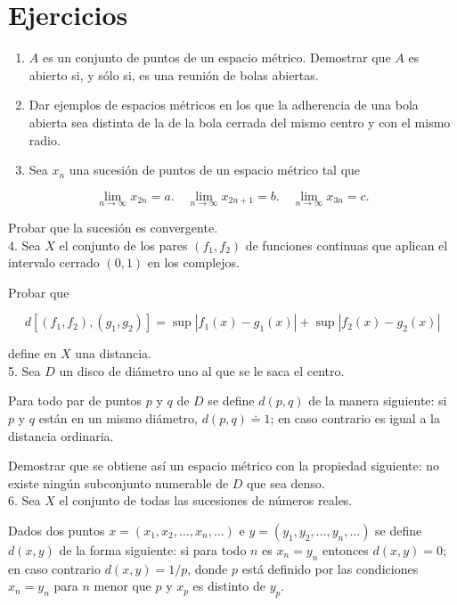 \documentclass[10pt]{article}
\theoremstyle{plain}
\theoremstyle{definition}
\theoremstyle{remark}
\begin{document}
\section*{Ejercicios}
\begin{enumerate}
  \item $A$ es un conjunto de puntos de un espacio métrico. Demostrar que $A$ es abierto si, y sólo si, es una reunión de bolas abiertas.
  \item Dar ejemplos de espacios métricos en los que la adherencia de una bola abierta sea distinta de la de la bola cerrada del mismo centro y con el mismo radio.
  \item Sea $x_{n}$ una sucesión de puntos de un espacio métrico tal que
\end{enumerate}

$$
\lim _{n \rightarrow \infty} x_{2 n}=a . \quad \lim _{n \rightarrow \infty} x_{2 n+1}=b . \quad \lim _{n \rightarrow \infty} x_{3 n}=c .
$$

Probar que la sucesión es convergente.\\
4. Sea $X$ el conjunto de los pares $\left(f_{1}, f_{2}\right)$ de funciones continuas que aplican el intervalo cerrado $(0,1)$ en los complejos.

Probar que

$$
d\left[\left(f_{1}, f_{2}\right),\left(g_{1}, g_{2}\right)\right]=\sup \left|f_{1}(x)-g_{1}(x)\right|+\sup \left|f_{2}(x)-g_{2}(x)\right|
$$

define en $X$ una distancia.\\
5. Sea $D$ un disco de diámetro uno al que se le saca el centro.

Para todo par de puntos $p$ y $q$ de $D$ se define $d(p, q)$ de la manera siguiente: si $p$ y $q$ están en un mismo diámetro, $d(p, q) \doteq 1$; en caso contrario es igual a la distancia ordinaria.

Demostrar que se obtiene así un espacio métrico con la propiedad siguiente: no existe ningún subconjunto numerable de $D$ que sea denso.\\
6. Sea $X$ el conjunto de todas las sucesiones de números reales.

Dados dos puntos $x=\left(x_{1}, x_{2}, \ldots, x_{n}, \ldots\right)$ e $y=\left(y_{1}, y_{2}, \ldots, y_{n}, \ldots\right)$ se define $d(x, y)$ de la forma siguiente: si para todo $n$ es $x_{n}=y_{n}$ entonces $d(x, y)=0$; en caso contrario $d(x, y)=1 / p$, donde $p$ está definido por las condiciones $x_{n}=y_{n}$ para $n$ menor que $p$ y $x_{p}$ es distinto de $y_{p}$.
\end{document}
